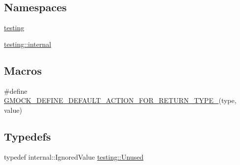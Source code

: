 \subsection*{Namespaces}
\begin{DoxyCompactItemize}
\item 
 \hyperlink{namespacetesting}{testing}
\item 
 \hyperlink{namespacetesting_1_1internal}{testing\+::internal}
\end{DoxyCompactItemize}
\subsection*{Macros}
\begin{DoxyCompactItemize}
\item 
\#define \hyperlink{gmock-actions_8h_a06b1e6cd1145acf7849e4a112976016b}{G\+M\+O\+C\+K\+\_\+\+D\+E\+F\+I\+N\+E\+\_\+\+D\+E\+F\+A\+U\+L\+T\+\_\+\+A\+C\+T\+I\+O\+N\+\_\+\+F\+O\+R\+\_\+\+R\+E\+T\+U\+R\+N\+\_\+\+T\+Y\+P\+E\+\_\+}(type,  value)
\end{DoxyCompactItemize}
\subsection*{Typedefs}
\begin{DoxyCompactItemize}
\item 
typedef internal\+::\+Ignored\+Value \hyperlink{namespacetesting_a603e329ec0263ebfcf16f712810bd511}{testing\+::\+Unused}
\end{DoxyCompactItemize}
